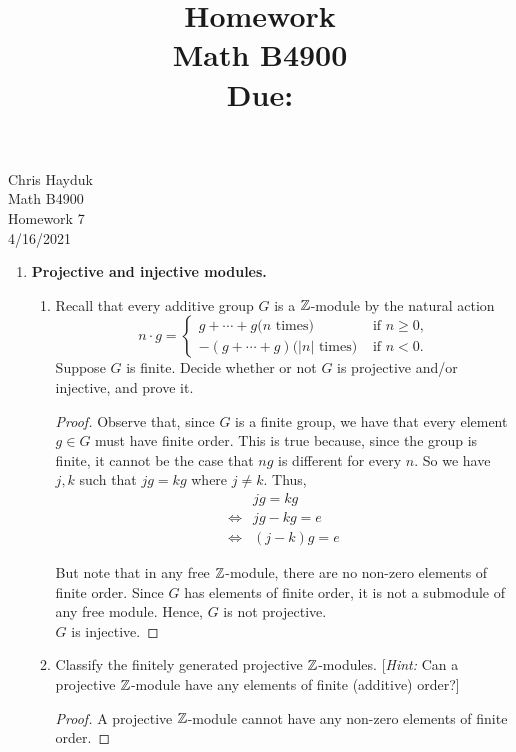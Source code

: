 \documentclass[11pt, reqno]{amsart}
\title[Homework \HW]{Homework \HW \\
Math B4900\\
\small Due: \DUE}
\author{}
\date{}                                           %
\theoremstyle{plain}
\theoremstyle{definition}
\theoremstyle{example}
\def\HW{7}
\def\DUE{4/16/2021}
\begin{document}
\begin{flushright}
Chris Hayduk\\
Math B4900\\
Homework \HW\\
\DUE
\end{flushright}


\begin{enumerate}[1.]
\item \textbf{Projective and injective modules.} 
\begin{enumerate}
\item Recall that every additive group $G$ is a $\mathbb{Z}$-module by the natural action 
$$n \cdot g = \begin{cases} g + \cdots + g \text{($n$ times)} & \text{ if $n \ge 0$,}\\
			-(g + \cdots + g) \text{($|n|$ times)} & \text{ if $n < 0$.}\end{cases}$$
Suppose $G$ is finite. Decide whether or not $G$ is projective and/or injective, and prove it.

\begin{proof}
Observe that, since $G$ is a finite group, we have that every element $g \in G$ must have finite order. This is true because, since the group is finite, it cannot be the case that $ng$ is different for every $n$. So we have $j, k$ such that $jg = kg$ where $j \neq k$. Thus,
\begin{align*}
&jg = kg\\
\iff &jg - kg = e\\
\iff &(j - k)g = e
\end{align*}

But note that in any free $\mathbb{Z}$-module, there are no non-zero elements of finite order. Since $G$ has elements of finite order, it is not a submodule of any free module. Hence, $G$ is not projective.\\

$G$ is injective.
\end{proof}

\item Classify the finitely generated projective $\mathbb{Z}$-modules. {[\emph{Hint:} Can a projective $\mathbb{Z}$-module have any elements of finite (additive) order?]}

\begin{proof}
A projective $\mathbb{Z}$-module cannot have any non-zero elements of finite order.
\end{proof}
\end{enumerate}


\end{enumerate}
\end{document}
